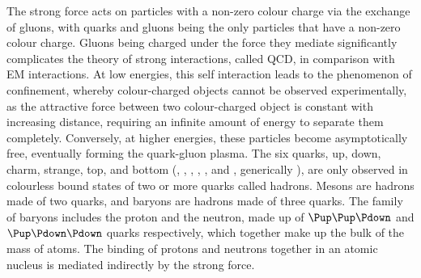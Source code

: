 The strong force acts on particles with a non-zero colour charge via the 
exchange of gluons, with quarks and gluons being the only particles that have a 
non-zero colour charge.
Gluons being charged under the force they mediate significantly complicates the 
theory of strong interactions, called \ac{QCD}, in comparison with \ac{EM} 
interactions.
At low energies, this self interaction leads to the phenomenon of confinement, 
whereby colour-charged objects cannot be observed experimentally, as the 
attractive force between two colour-charged object is constant with increasing 
distance, requiring an infinite amount of energy to separate them completely.
Conversely, at higher energies, these particles become asymptotically free, 
eventually forming the quark-gluon plasma.
The six quarks, up, down, charm, strange, top, and bottom (\Pup, \Pdown, 
\Pcharm, \Pstrange, \Ptop, and \Pbottom, generically \Pquark), are only 
observed in colourless bound states of two or more quarks called hadrons.
Mesons are hadrons made of two quarks, and baryons are hadrons made of three 
quarks.
The family of baryons includes the proton and the neutron, made up of 
$\Pup\Pup\Pdown$ and $\Pup\Pdown\Pdown$ quarks respectively, which together 
make up the bulk of the mass of atoms.
The binding of protons and neutrons together in an atomic nucleus is mediated 
indirectly by the strong force.

